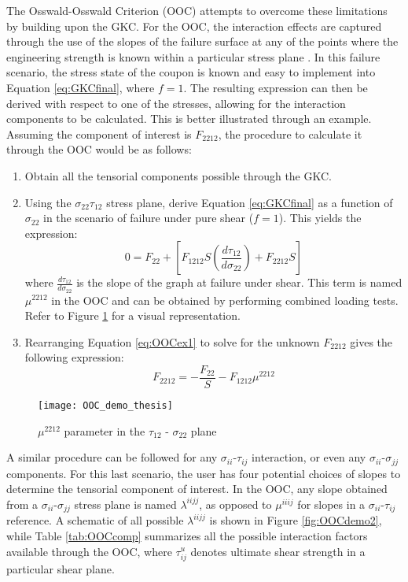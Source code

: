 \documentclass[main.tex]{subfiles}
\begin{document}
The Osswald-Osswald Criterion (OOC) attempts to overcome these limitations by building upon the GKC. For the OOC, the interaction effects are captured through the use of the slopes of the failure surface at any of the points where the engineering strength is known within a particular stress plane \cite{Osswald2017a}. In this failure scenario, the stress state of the coupon is known and easy to implement into Equation \ref{eq:GKCfinal}, where $f=1$. The resulting expression can then be derived with respect to one of the stresses, allowing for the interaction components to be calculated. This is better illustrated through an example. Assuming the component of interest is $F_{2212}$, the procedure to calculate it through the OOC would be as follows:

\pagebreak
\begin{enumerate}
	\item Obtain all the tensorial components possible through the GKC.
	\item Using the $\sigma_{22}$\textendash$\tau_{12}$ stress plane, derive Equation \ref{eq:GKCfinal} as a function of $\sigma_{22}$ in the scenario of failure under pure shear ($f=1$). This yields the expression:
	\begin{equation} \label{eq:OOCex1}
	 0= F_{22}+[F_{1212}S(\frac{d\tau_{12}}{d\sigma_{22}})+F_{2212}S]
	\end{equation}
	 where $\frac{d\tau_{12}}{d\sigma_{22}}$  is the slope of the graph at failure under shear. This term is named $\mu^{2212}$ in the OOC and can be obtained by performing combined loading tests. Refer to Figure \ref{fig:OOCdemo} for a visual representation.
	\item Rearranging Equation \ref{eq:OOCex1} to solve for the unknown $F_{2212}$ gives the following expression:
	\begin{equation} \label{eq:OOCex2}
	F_{2212}=-\frac{F_{22}}{S}-F_{1212}\mu^{2212}
	\end{equation}
\end{enumerate}

\begin{figure}[h]
	\center
	\texttt{[image: OOC\_demo\_thesis]}
	\caption{$\mu^{2212}$ parameter in the $\tau_{12}$ - $\sigma_{22}$ plane} \label{fig:OOCdemo}
\end{figure}

A similar procedure can be followed for any $\sigma_{ii}$-$\tau_{ij}$ interaction, or even any $\sigma_{ii}$-$\sigma_{jj}$ components. For this last scenario, the user has four potential choices of slopes to determine the tensorial component of interest. In the OOC, any slope obtained from a $\sigma_{ii}$-$\sigma_{jj}$ stress plane is named $\lambda^{iijj}$, as opposed to $\mu^{iiij}$ for slopes in a $\sigma_{ii}$-$\tau_{ij}$ reference. A schematic of all possible $\lambda^{iijj}$ is shown in Figure \ref{fig:OOCdemo2}, while Table \ref{tab:OOCcomp} summarizes all the possible interaction factors available through the OOC, where $\tau_{ij}^u$ denotes ultimate shear strength in a particular shear plane. 
\end{document}
